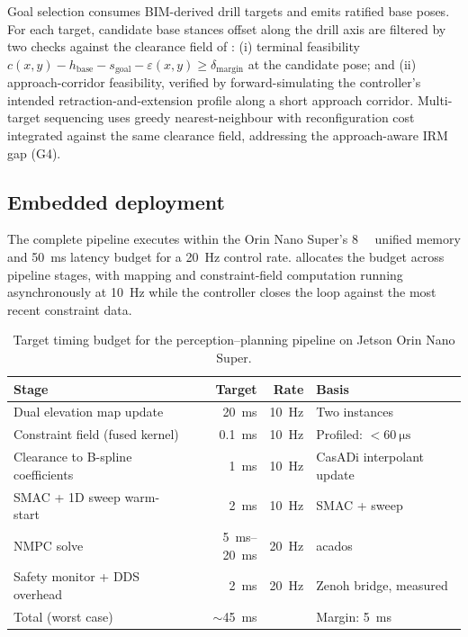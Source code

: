 \documentclass[11pt,a4paper]{article}
\begin{document}
Goal selection consumes BIM-derived drill targets and emits ratified base poses. For each target, candidate base stances offset along the drill axis are filtered by two checks against the clearance field of : (i) terminal feasibility $c(x, y) - h_\mathrm{base} - s_\mathrm{goal} - \varepsilon(x, y) \geq \delta_\mathrm{margin}$ at the candidate pose; and (ii) approach-corridor feasibility, verified by forward-simulating the controller's intended retraction-and-extension profile along a short approach corridor. Multi-target sequencing uses greedy nearest-neighbour with reconfiguration cost integrated against the same clearance field, addressing the approach-aware IRM gap (G4).

\subsection{Embedded deployment}
\label{sec:meth:embedded}

The complete pipeline executes within the Orin Nano Super's \SI{8}{\giga\byte} unified memory and \SI{50}{\milli\second} latency budget for a \SI{20}{\hertz} control rate.  allocates the budget across pipeline stages, with mapping and constraint-field computation running asynchronously at \SI{10}{\hertz} while the controller closes the loop against the most recent constraint data.

\begin{table}[htbp]
\centering
\caption{Target timing budget for the perception--planning pipeline on Jetson Orin Nano Super.}
\label{tab:timing}
\small
\setlength{\tabcolsep}{6pt}
\begin{tabularx}{\linewidth}{@{}l r r >{\raggedright\arraybackslash}X@{}}
\toprule
Stage & Target & Rate & Basis \\
\midrule
Dual elevation map update & \SI{20}{\milli\second} & \SI{10}{\hertz} & Two instances~\parencite{mikiElevationMappingLocomotion2022} \\
Constraint field (fused kernel) & \SI{0.1}{\milli\second} & \SI{10}{\hertz} & Profiled: $< \SI{60}{\micro\second}$ \\
Clearance to B-spline coefficients & \SI{1}{\milli\second} & \SI{10}{\hertz} & CasADi interpolant update \\
SMAC + 1D sweep warm-start & \SI{2}{\milli\second} & \SI{10}{\hertz} & SMAC + sweep~\parencite{macenskiOpenSourceCostAwareKinematically2025} \\
NMPC solve & \SIrange{5}{20}{\milli\second} & \SI{20}{\hertz} & acados~\parencite{verschueren2022acados,enrico2025nmpcmppi} \\
Safety monitor + DDS overhead & \SI{2}{\milli\second} & \SI{20}{\hertz} & Zenoh bridge, measured \\
\midrule
Total (worst case) & $\sim$\SI{45}{\milli\second} & & Margin: \SI{5}{\milli\second} \\
\bottomrule
\end{tabularx}
\end{table}
\end{document}
